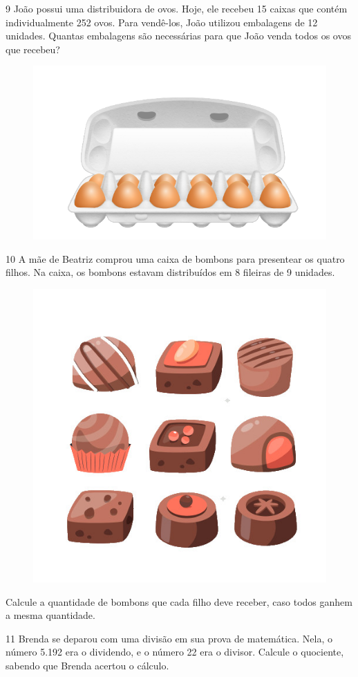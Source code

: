 \pagebreak
\num{9} João possui uma distribuidora de ovos. Hoje, ele recebeu 15 caixas  
que contém individualmente 252 ovos. Para vendê-los, João utilizou embalagens de
12 unidades. Quantas embalagens são necessárias para que João venda 
todos os ovos que recebeu?

\begin{figure}[htpb!]
\centering
\includegraphics[width=.5\textwidth]{./media/image16a.png}
\end{figure}

\num{10} A mãe de Beatriz comprou uma caixa de bombons para presentear os quatro filhos. 
Na caixa, os bombons estavam distribuídos em 8 fileiras de 9 unidades. 

\begin{figure}[htpb!]
\centering
\includegraphics[width=.4\textwidth]{./media/image16b.jpeg}
\end{figure}

Calcule a quantidade de bombons que cada filho deve receber, caso todos ganhem a mesma quantidade.


\num{11} Brenda se deparou com uma divisão em sua prova de matemática. 
Nela, o número 5.192 era o dividendo, e o número 22 era o divisor. 
Calcule o quociente, sabendo que Brenda acertou o cálculo.

